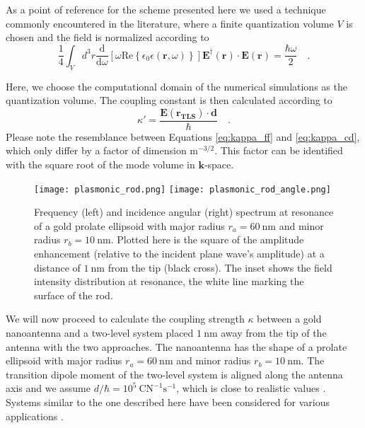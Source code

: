 \documentclass[10pt,letterpaper]{article}
\renewcommand{\vec}[1]{\mathbf{#1}}
\begin{document}
As a point of reference for the scheme presented here we used a technique commonly encountered in the literature, where a finite quantization volume $V$ is chosen and the field is normalized according to \cite{Vernooy1997, Buck2003, Slowik2013, Esteban2014}
\begin{equation} \label{eq:numerical_integral}
\frac{1}{4}\int_{V} d^{3}r\frac{\text{d}}{\text{d}\omega}\left[\omega\text{Re}\left\{\epsilon_0\epsilon(\vec{r},\omega)\right\}\right]\vec{E}^{\dagger}(\vec{r})\cdot\vec{E}(\vec{r}) = \frac{\hbar\omega}{2} \quad .
\end{equation}

Here, we choose the computational domain of the numerical simulations as the quantization volume. The coupling constant is then calculated according to \cite{Vogel1994}
\begin{equation}
\kappa' = \frac{\vec{E}(\vec{r_{\text{TLS}}})\cdot\vec{d}}{\hbar} \quad . \label{eq:kappa_cd}
\end{equation}
Please note the resemblance between Equations \eqref{eq:kappa_ff} and \eqref{eq:kappa_cd}, which only differ by a factor of dimension $\text{m}^{-3/2}$. This factor can be identified with the square root of the mode volume in $\vec{k}$-space.

\begin{figure}
\begin{center}
\texttt{[image: plasmonic\_rod.png]}
\texttt{[image: plasmonic\_rod\_angle.png]}
\end{center}
\caption{Frequency (left) and incidence angular (right) spectrum at resonance of a gold prolate ellipsoid with major radius $r_a = 60~\text{nm}$ and minor radius $r_b = 10~\text{nm}$. Plotted here is the square of the amplitude enhancement (relative to the incident plane wave's amplitude) at a distance of $1~\text{nm}$ from the tip (black cross). The inset shows the field intensity distribution at resonance, the white line marking the surface of the rod.}
\label{fig:plasmonic_rod}
\end{figure}

We will now proceed to calculate the coupling strength $\kappa$ between a gold nanoantenna and a two-level system placed $1~\text{nm}$ away from the tip of the antenna with the two approaches. The nanoantenna has the shape of a prolate ellipsoid with major radius $r_a = 60~\text{nm}$ and minor radius $r_b = 10~\text{nm}$. The transition dipole moment of the two-level system is aligned along the antenna axis and we assume $d/\hbar = 10^5~\text{C}\text{N}^{-1}\text{s}^{-1}$, which is close to realistic values \cite{Eliseev2000}. Systems similar to the one described here have been considered for various applications \cite{Maksymov2011, Slowik2013}.
\end{document}
